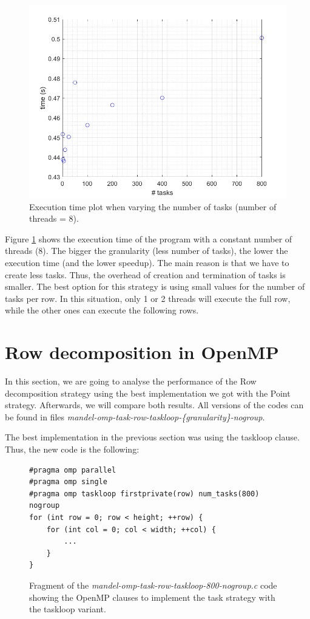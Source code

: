 \documentclass[12pt, a4paper]{article}
\begin{document}
\begin{figure}[H]
  \centering
  \includegraphics[scale=0.5]{./num_task_point}
  \caption{Execution time plot when varying the number of tasks (number of threads = 8).}
  \label{fig:num_task_point}
\end{figure}

Figure \ref{fig:num_task_point} shows the execution time of the program with a constant number of threads (8). The bigger the granularity (less number of tasks), the lower the execution time (and the lower speedup). The main reason is that we have to create less tasks. Thus, the overhead of creation and termination of tasks is smaller. The best option for this strategy is using small values for the number of tasks per row. In this situation, only 1 or 2 threads will execute the full row, while the other ones can execute the following rows.

\section{Row decomposition in OpenMP}

In this section, we are going to analyse the performance of the Row decomposition strategy using the best implementation we got with the Point strategy. Afterwards, we will compare both results. All versions of the codes can be found in files \textit{mandel-omp-task-row-taskloop-\{granularity\}-nogroup}.

The best implementation in the previous section was using the taskloop clause. Thus, the new code is the following:

\begin{figure}[H]
\begin{lstlisting}
#pragma omp parallel
#pragma omp single
#pragma omp taskloop firstprivate(row) num_tasks(800) nogroup
for (int row = 0; row < height; ++row) {
    for (int col = 0; col < width; ++col) {
        ...
	}
}
\end{lstlisting}
\caption{Fragment of the \textit{mandel-omp-task-row-taskloop-800-nogroup.c} code showing the OpenMP clauses to implement the task strategy with the taskloop variant.}
\label{code:task_implementation_row_taskloop_800}
\end{figure}
\end{document}
